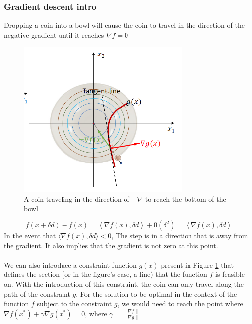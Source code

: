 \subsubsection{Gradient descent intro}
Dropping a coin into a bowl will cause the coin to travel in the direction of the negative gradient until it reaches $\nabla f = 0$
\begin{figure}[htbp]
  \centerline{\includegraphics[width=0.75\textwidth]{images/gradient_bowl.png}}
  \caption{A coin traveling in the direction of $-\nabla$ to reach the bottom of the bowl}
  \label{fig:gradient_bowl}
\end{figure}

\begin{equation}
  f(x+\delta d) - f(x) = \left\langle \nabla f(x), \delta d \right\rangle  + 0(\delta^2) = \left\langle \nabla f(x), \delta d \right\rangle
\end{equation}
In the event that $\langle \nabla f(x), \delta d  \rangle < 0$, The step is in a direction that is away from the gradient. It also implies that the gradient is not zero at this point.
\\ \\ 
We can also introduce a constraint function $g(x)$ present in Figure \ref{fig:gradient_bowl} that defines the section (or in the figure's case, a line) that the function $f$ is feasible on. With the introduction of this constraint, the coin can only travel along the path of the constraint $g$. For the solution to be optimal in the context of the function $f$ subject to the constraint $g$, we would need to reach the point where $\nabla f(x^*) + \gamma \nabla g(x^*) = 0 $, where $\gamma = \frac{\| \nabla f \|}{\| \nabla g \|}$